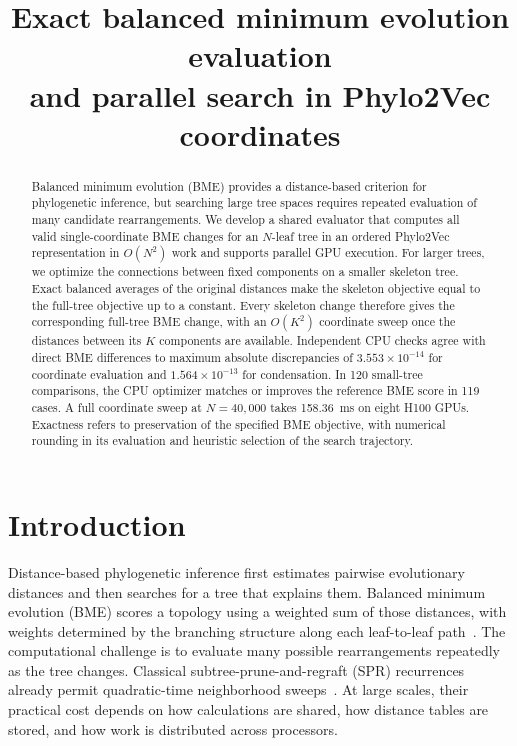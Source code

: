 \documentclass[11pt,a4paper]{article}
\title{Exact balanced minimum evolution evaluation\\and parallel search in Phylo2Vec coordinates}
\author{}
\date{}
\makeatletter
\DeclareRobustCommand{\_}{\ifmmode\nfss@text{\textunderscore}\else\textunderscore\allowbreak\fi}
\theoremstyle{definition}
\makeatother
\begin{document}
\maketitle

\begin{abstract}
Balanced minimum evolution (BME) provides a distance-based criterion for phylogenetic inference, but searching large tree spaces requires repeated evaluation of many candidate rearrangements.
We develop a shared evaluator that computes all valid single-coordinate BME changes for an $N$-leaf tree in an ordered Phylo2Vec representation in $O(N^2)$ work and supports parallel GPU execution.
For larger trees, we optimize the connections between fixed components on a smaller skeleton tree.
Exact balanced averages of the original distances make the skeleton objective equal to the full-tree objective up to a constant.
Every skeleton change therefore gives the corresponding full-tree BME change, with an $O(K^2)$ coordinate sweep once the distances between its $K$ components are available.
Independent CPU checks agree with direct BME differences to maximum absolute discrepancies of $3.553\times10^{-14}$ for coordinate evaluation and $1.564\times10^{-13}$ for condensation.
In 120 small-tree comparisons, the CPU optimizer matches or improves the reference BME score in 119 cases.
A full coordinate sweep at $N=40{,}000$ takes 158.36~ms on eight H100 GPUs.
Exactness refers to preservation of the specified BME objective, with numerical rounding in its evaluation and heuristic selection of the search trajectory.
\end{abstract}

\section{Introduction}
\label{sec:introduction}

Distance-based phylogenetic inference first estimates pairwise evolutionary distances and then searches for a tree that explains them.
Balanced minimum evolution (BME) scores a topology using a weighted sum of those distances, with weights determined by the branching structure along each leaf-to-leaf path~\cite{pauplin2000direct,desper2002fast,desper2004theory}.
The computational challenge is to evaluate many possible rearrangements repeatedly as the tree changes.
Classical subtree-prune-and-regraft (SPR) recurrences already permit quadratic-time neighborhood sweeps~\cite{hordijk2005spr,lefort2015fastme}.
At large scales, their practical cost depends on how calculations are shared, how distance tables are stored, and how work is distributed across processors.
\end{document}
